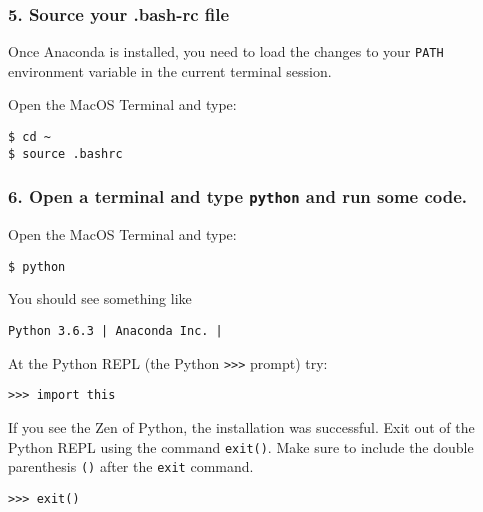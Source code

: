\documentclass{book}
\newcommand{\passthrough}[1]{#1}
\begin{document}
    
        \hypertarget{source-your-.bash-rc-file}{%
\subsubsection{5. Source your .bash-rc
file}\label{source-your-.bash-rc-file}}

Once Anaconda is installed, you need to load the changes to your
\passthrough{\lstinline!PATH!} environment variable in the current
terminal session.

Open the MacOS Terminal and type:

\begin{lstlisting}
$ cd ~
$ source .bashrc
\end{lstlisting}
    




    
        \hypertarget{open-a-terminal-and-type-python-and-run-some-code.}{%
\subsubsection{\texorpdfstring{6. Open a terminal and type
\texttt{python} and run some
code.}{6. Open a terminal and type python and run some code.}}\label{open-a-terminal-and-type-python-and-run-some-code.}}

Open the MacOS Terminal and type:

\begin{lstlisting}
$ python
\end{lstlisting}

You should see something like

\begin{lstlisting}
Python 3.6.3 | Anaconda Inc. |
\end{lstlisting}

At the Python REPL (the Python \passthrough{\lstinline!>>>!} prompt)
try:

\begin{lstlisting}
>>> import this
\end{lstlisting}

If you see the Zen of Python, the installation was successful. Exit out
of the Python REPL using the command \passthrough{\lstinline!exit()!}.
Make sure to include the double parenthesis \passthrough{\lstinline!()!}
after the \passthrough{\lstinline!exit!} command.

\begin{lstlisting}
>>> exit()
\end{lstlisting}
    
\end{document}
